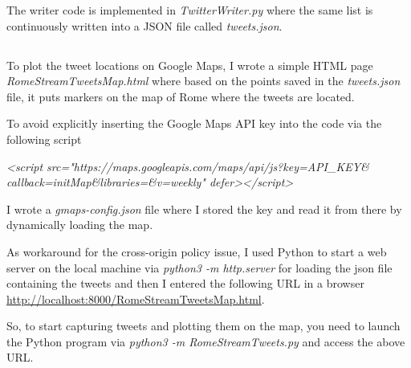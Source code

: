 \documentclass[11pt]{article}
\begin{document}
\bigskip
The writer code is implemented in \textit{TwitterWriter.py} where the same list is continuously written into a JSON file called \textit{tweets.json}.


\subsection{}
To plot the tweet locations on Google Maps, I wrote a simple HTML page \textit{RomeStreamTweetsMap.html}
where based on the points saved in the \textit{tweets.json} file, it puts markers on the map of Rome where the tweets are located.

\bigskip
To avoid explicitly inserting the Google Maps API key into the code via the following script \newline

\textit{\textless script src="https://maps.googleapis.com/maps/api/js?key=API\_KEY\& \newline
callback=initMap\&libraries=\&v=weekly" defer\textgreater \textless /script\textgreater} \newline

I wrote a \textit{gmaps-config.json} file where I stored the key and read it from there by dynamically loading the map.

\bigskip
As workaround for the cross-origin policy issue, I used Python to start a web server on the local machine via
\textit{python3 -m http.server} for loading the json file containing the tweets and then I entered the following URL in a browser
\url{http://localhost:8000/RomeStreamTweetsMap.html}.

\bigskip
So, to start capturing tweets and plotting them on the map, you need to launch the Python program via \textit{python3 -m RomeStreamTweets.py} and
access the above URL.
\end{document}

